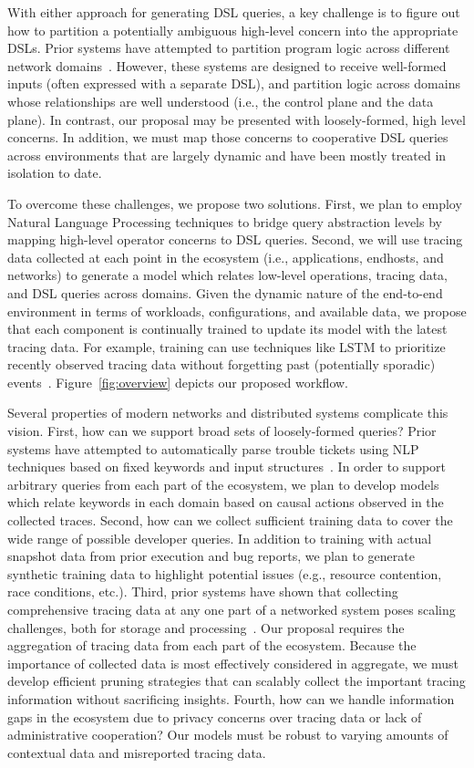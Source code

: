 With either approach for generating DSL queries, a key challenge is to figure
out how to partition a potentially ambiguous high-level concern into the
appropriate DSLs. Prior systems have attempted to partition program logic
across different network domains~\cite{snap,maple}. However, these systems are designed
to receive well-formed inputs (often expressed with a separate DSL), and
partition logic across domains whose relationships are well understood (i.e., the
control plane and the data plane). In contrast, our proposal may be presented
with loosely-formed, high level concerns. In addition, we must map those
concerns to cooperative DSL queries across environments that are largely dynamic
and have been mostly treated in isolation to date.

To overcome these challenges, we propose two solutions. First, we plan to
employ Natural Language Processing techniques to bridge query abstraction
levels by mapping high-level operator concerns to DSL queries.  Second, we will
use tracing data collected at each point in the ecosystem (i.e., applications,
endhosts, and networks) to generate a model which relates low-level operations,
tracing data, and DSL queries across domains. Given the dynamic nature of the
end-to-end environment in terms of workloads, configurations, and available
data, we propose that each component is continually trained to update its model
with the latest tracing data. For example, training can use techniques like
LSTM to prioritize recently observed tracing data without forgetting past
(potentially sporadic) events~\cite{concode}. Figure~\ref{fig:overview} depicts
our proposed workflow.

Several properties of modern networks and distributed systems complicate this
vision. First, how can we support broad sets of loosely-formed queries? Prior
systems have attempted to automatically parse trouble tickets using NLP
techniques based on fixed keywords and input structures~\cite{netsieve}. In
order to support arbitrary queries from each part of the ecosystem, we plan to
develop models which relate keywords in each domain based on causal actions
observed in the collected traces.  Second, how can we collect sufficient
training data to cover the wide range of possible developer queries.  In
addition to training with actual snapshot data from prior execution and bug
reports, we plan to generate synthetic training data to highlight potential
issues (e.g., resource contention, race conditions, etc.).  Third, prior
systems have shown that collecting comprehensive tracing data at any one part
of a networked system poses scaling challenges, both for storage and
processing~\cite{pathqueries,demi}. Our proposal requires the aggregation of
tracing data from each part of the ecosystem. Because the importance of
collected data is most effectively considered in aggregate, we must develop
efficient pruning strategies that can scalably collect the important tracing
information without sacrificing insights.  Fourth, how can we handle
information gaps in the ecosystem due to privacy concerns over tracing data or
lack of administrative cooperation? Our models must be robust to varying
amounts of contextual data and misreported tracing data.

